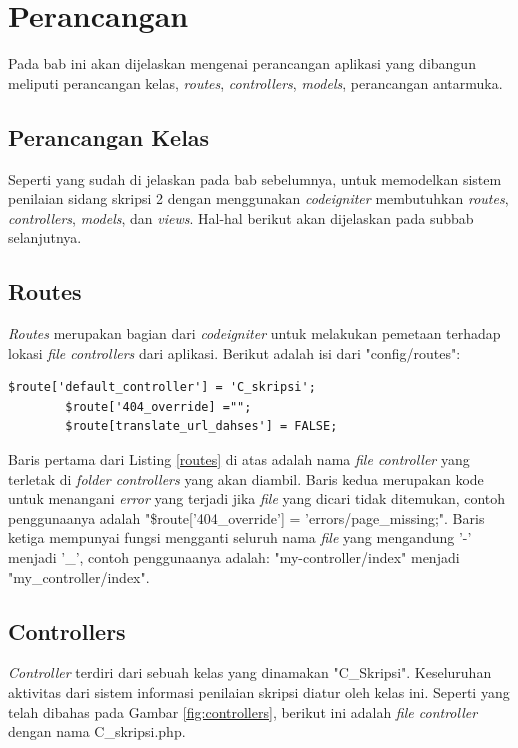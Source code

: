 \chapter{Perancangan}
\label{chap: perancangan}
	
	Pada bab ini akan dijelaskan mengenai perancangan aplikasi yang dibangun meliputi perancangan kelas, \textit{routes}, \textit{controllers}, \textit{models}, perancangan antarmuka.
	
	\section{Perancangan Kelas}
	\label{sec: rancangKelas}
	
	Seperti yang sudah di jelaskan pada bab sebelumnya, untuk memodelkan sistem penilaian sidang skripsi 2 dengan menggunakan \textit{codeigniter} membutuhkan \textit{routes}, \textit{controllers}, \textit{models}, dan \textit{views}. Hal-hal berikut akan dijelaskan pada subbab selanjutnya.
	
	\section{Routes}
	\label{sec: routes}
	
	\textit{Routes} merupakan bagian dari \textit{codeigniter} untuk melakukan pemetaan terhadap lokasi \textit{file controllers} dari aplikasi. Berikut adalah isi dari "config/routes":
	\begin{lstlisting}[caption= File Routes, label= routes]
		$route['default_controller'] = 'C_skripsi';
		$route['404_override] ="";
		$route[translate_url_dahses'] =	FALSE;
	\end{lstlisting}
	Baris pertama dari Listing \ref{routes} di atas adalah nama \textit{file controller} yang terletak di \textit{folder controllers} yang akan diambil. Baris kedua merupakan kode untuk menangani \textit{error} yang terjadi jika \textit{file} yang dicari tidak ditemukan, contoh penggunaanya adalah "\$route['404\_override'] = 'errors/page\_missing;". Baris ketiga mempunyai fungsi mengganti seluruh nama \textit{file} yang mengandung '-' menjadi '\_', contoh penggunaanya adalah: "my-controller/index"	menjadi "my\_controller/index".

	\section{Controllers}
	\label{sec: controllers}
	
	\textit{Controller} terdiri dari sebuah kelas yang dinamakan "C\_Skripsi". Keseluruhan aktivitas dari sistem informasi penilaian skripsi diatur oleh kelas ini. Seperti yang telah dibahas pada Gambar \ref{fig:controllers}, berikut ini adalah \textit{file controller} dengan nama C\_skripsi.php.
	
